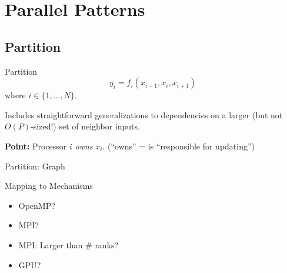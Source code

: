 \documentclass[english,compress]{beamer}
\begin{document}
\section{Parallel Patterns}
\subsection{Partition}
\begin{frame}{Partition}
  {\Huge
  \[
    y_i = f_i(x_{i-1}, x_i, x_{i+1})
  \]}
  where $i\in\{1,\dots,N\}$.

  \pause
  \bigskip
  Includes straightforward
  generalizations to dependencies on a larger (but
  not $O(P)$-sized!) set of neighbor inputs.

  \pause
  \bigskip
  \textbf{Point:} Processor $i$ \emph{owns} $x_i$. (``owns'' = is
  ``responsible for updating'')
\end{frame}
\begin{frame}{Partition: Graph}
  \begin{center}
  \end{center}
\end{frame}
\begin{frame}{Mapping to Mechanisms}
  \begin{itemize}[<+->]
    \item OpenMP?
    \item MPI?
    \item MPI: Larger than \# ranks?
    \item GPU?
  \end{itemize}
\end{frame}
\end{document}
